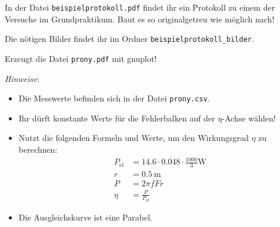\documentclass[a4paper, 12pt, headsepline, pagesize=auto]{scrartcl}
\newcounter{aufgabe}
\newenvironment{aufgabe*}[1][]{\stepcounter{aufgabe}
\noindent\textbf{Aufgabe \arabic{aufgabe}.} #1}{\bigskip}
\begin{document}
\begin{aufgabe*}
In der Datei \texttt{beispielprotokoll.pdf} findet ihr ein Protokoll zu einem der Versuche im Grundpraktikum. Baut es so originalgetreu wie möglich nach!

Die nötigen Bilder findet ihr im Ordner \texttt{beispielprotokoll\_bilder}.
\end{aufgabe*}

\begin{aufgabe*}
	Erzeugt die Datei \texttt{prony.pdf} mit gnuplot!
	
	\emph{Hinweise}:
	\begin{itemize}
		\item Die Messwerte befinden sich in der Datei \texttt{prony.csv}.
		\item Ihr dürft konstante Werte für die Fehlerbalken auf der $\eta$-Achse wählen!
		\item Nutzt die folgenden Formeln und Werte, um den Wirkungsgrad $\eta$ zu berechnen:
		\begin{align*}
		P_\text{el} &= \num{14.6} \cdot \num{0.048} \cdot \frac{1000}{3} \si{\W} \\
		r &= \SI{0,5}{\m} \\
		P &= 2 \pi f F r \\
		\eta &= \frac{P}{P_\text{el}}
		\end{align*}
		\item Die Ausgleichskurve ist eine Parabel.
	\end{itemize}
\end{aufgabe*}
\end{document}
